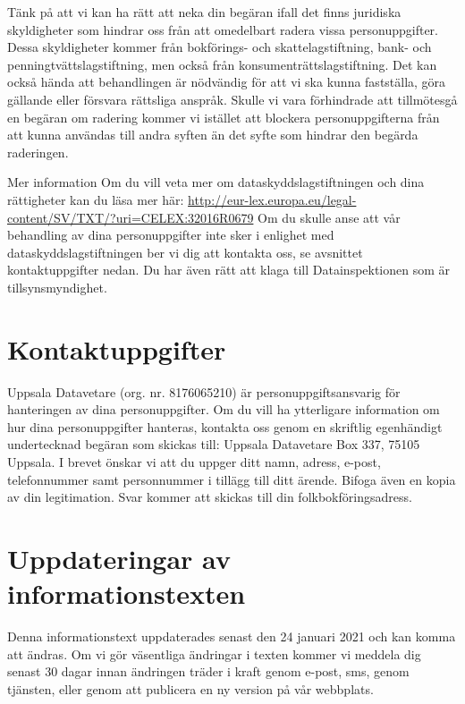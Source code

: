 \documentclass[a4paper]{article}
\begin{document}
Tänk på att vi kan ha rätt att neka din begäran ifall det finns juridiska skyldigheter som
hindrar oss från att omedelbart radera vissa personuppgifter. Dessa skyldigheter
kommer från bokförings- och skattelagstiftning, bank- och penningtvättslagstiftning,
men också från konsumenträttslagstiftning. Det kan också hända att behandlingen är
nödvändig för att vi ska kunna fastställa, göra gällande eller försvara rättsliga anspråk.
Skulle vi vara förhindrade att tillmötesgå en begäran om radering kommer vi istället att
blockera personuppgifterna från att kunna användas till andra syften än det syfte som
hindrar den begärda raderingen.

Mer information
Om du vill veta mer om dataskyddslagstiftningen och dina rättigheter kan du läsa mer
här:
\url{http://eur-lex.europa.eu/legal-content/SV/TXT/?uri=CELEX:32016R0679}
Om du skulle anse att vår behandling av dina personuppgifter inte sker i enlighet med
dataskyddslagstiftningen ber vi dig att kontakta oss, se avsnittet kontaktuppgifter
nedan. Du har även rätt att klaga till Datainspektionen som är tillsynsmyndighet.

\section{Kontaktuppgifter}

Uppsala Datavetare (org. nr. 8176065210) är
personuppgiftsansvarig för hanteringen av dina personuppgifter. Om du vill ha
ytterligare information om hur dina personuppgifter hanteras, kontakta oss genom
en skriftlig egenhändigt undertecknad begäran som skickas till: Uppsala Datavetare
Box 337, 75105 Uppsala. 
I brevet önskar vi att du uppger ditt namn, adress, e-post, telefonnummer samt
personnummer i tillägg till ditt ärende. Bifoga även en kopia av din legitimation. Svar
kommer att skickas till din folkbokföringsadress.

\section{Uppdateringar av informationstexten}

Denna informationstext uppdaterades senast den 24 januari 2021 och kan komma att
ändras. Om vi gör väsentliga ändringar i texten kommer vi meddela dig senast 30 dagar
innan ändringen träder i kraft genom e-post, sms, genom tjänsten, eller genom att
publicera en ny version på vår webbplats.
\end{document}
